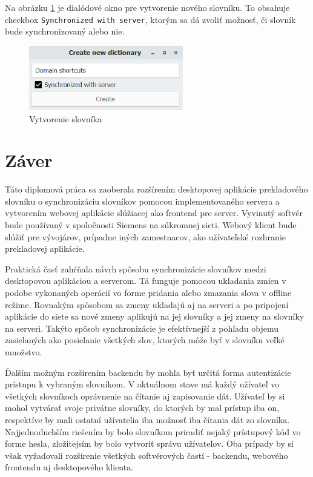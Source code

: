 \documentclass[
  digital, %
  table,   %
  lof,     %
  lot,     %
]{fithesis3}
\begin{document}
Na obrázku \ref{fig:desktop-ispublic} je dialódové okno pre vytvorenie nového slovníku. To obsahuje checkbox \texttt{Synchronized with server}, ktorým sa dá zvoliť možnosť, či slovník bude synchronizovaný alebo nie.
\begin{figure}
	\begin{center}
	\includegraphics[width=0.6\textwidth]{img/desktop-ispublic.png}
	\end{center}
    \caption{Vytvorenie slovníka}
	\label{fig:desktop-ispublic}
\end{figure}

\chapter{Záver}
Táto diplomová práca sa zaoberala rozšírením desktopovej aplikácie prekladového slovníku o synchronizáciu slovníkov pomocou implementovaného servera a vytvorením webovej aplikácie slúžiacej ako frontend pre server. Vyvinutý softvér bude používaný v spoločnosti Siemens na súkromnej sieti. Webový klient bude slúžiť pre vývojárov, prípadne iných zamestnacov, ako užívateľské rozhranie prekladovej aplikácie.

Praktická časť zahŕňala návrh spôsobu synchronizácie slovníkov medzi desktopovou aplikáciou a serverom. Tá funguje pomocou ukladania zmien v podobe vykonaných operácií vo forme pridania alebo zmazania slova v offline režime. Rovnakým spôsobom sa zmeny ukladajú aj na serveri a po pripojení aplikácie do siete sa nové zmeny aplikujú na jej slovníky a jej zmeny na slovníky na serveri. Takýto spôsob synchronizácie je efektívnejší z pohľadu objemu zasielaných ako posielanie všetkých slov, ktorých môže byť v slovníku veľké množstvo.

Ďalším možným rozšírením backendu by mohla byť určitá forma autentizácie prístupu k vybraným slovníkom. V aktuálnom stave má každý užívateľ vo všetkých slovníkoch oprávnenie na čítanie aj zapisovanie dát. Užívateľ by si mohol vytvárať svoje privátne slovníky, do ktorých by mal prístup iba on, respektíve by mali ostatní užívatelia iba možnosť iba čítania dát zo slovníka. Najjednoduchším riešením by bolo slovníkom priradiť nejaký prístupový kód vo forme hesla, zložitejsím by bolo vytvoriť správu užívateľov. Oba prípady by si však vyžadovali rozšírenie všetkých softvérových častí - backendu, webového frontendu aj desktopového klienta.
\end{document}
